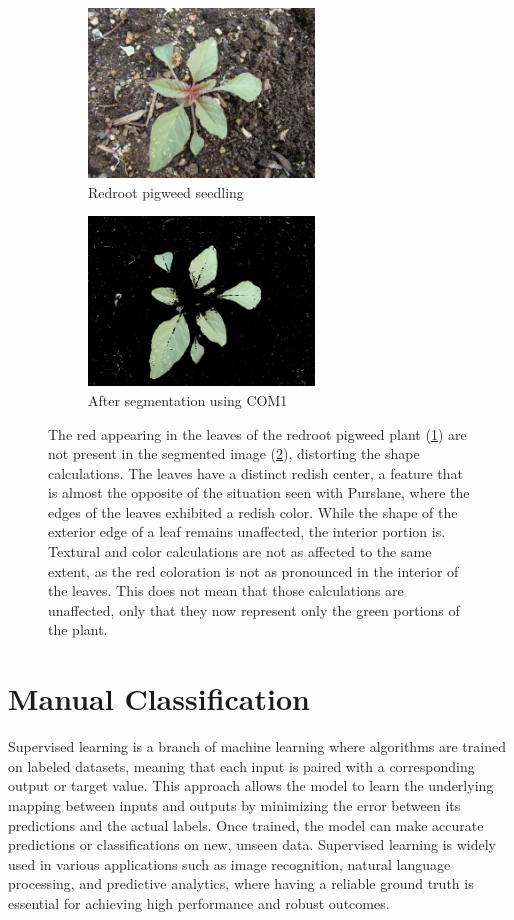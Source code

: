 \documentclass[letterpaper]{report}
\begin{document}
\begin{figure}[h!]
	\centering
	\begin{subfigure}[h]{.40\textwidth}
		\centering
		\includegraphics[width=6cm]{./figures/redroot-pigweed.jpg}
		\caption{Redroot pigweed seedling}
		\label{subfig:redroot-before}
	\end{subfigure}
	\begin{subfigure}[h]{.40\textwidth}
		\centering
		\includegraphics[width=6cm]{./figures/redroot-pigweed-COM1.jpg}
		\caption{After segmentation using COM1}
		\label{subfig:redroot-after}
	\end{subfigure}
	\caption[Red coloration within the leaves of redroot pigweed]{The red appearing in the leaves of the redroot pigweed plant (\ref{subfig:redroot-before}) are not present in the segmented image (\ref{subfig:redroot-after}), distorting the shape calculations. The leaves have a distinct redish center, a feature that is almost the opposite of the situation seen with Purslane, where the edges of the leaves exhibited a redish color. While the shape of the exterior edge of a leaf remains unaffected, the interior portion is. Textural and color calculations are not as affected to the same extent, as the red coloration is not as pronounced in the interior of the leaves. This does not mean that those calculations are unaffected, only that they now represent only the green portions of the plant.}
	\label{fig:redroot}
\end{figure}

\section{Manual Classification}
Supervised learning is a branch of machine learning where algorithms are trained on labeled datasets, meaning that each input is paired with a corresponding output or target value. This approach allows the model to learn the underlying mapping between inputs and outputs by minimizing the error between its predictions and the actual labels. Once trained, the model can make accurate predictions or classifications on new, unseen data. Supervised learning is widely used in various applications such as image recognition, natural language processing, and predictive analytics, where having a reliable ground truth is essential for achieving high performance and robust outcomes.  
\end{document}
